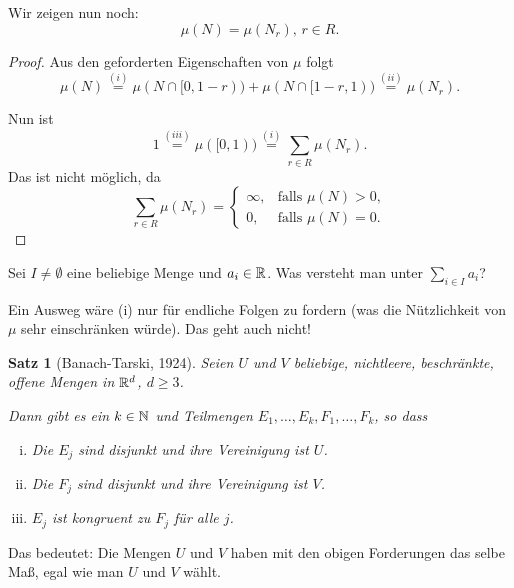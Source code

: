 \documentclass[
 a4paper,
 12pt,
 parskip=half
 ]{scrreprt}
\theoremstyle{plain}
\newtheorem{thm}{Satz}[section] %
\theoremstyle{definition}
\numberwithin{equation}{section}
\begin{document}
Wir zeigen nun noch:
\[ \mu( N ) = \mu(N_r),\, r \in R. \]

\begin{proof}
 Aus den geforderten Eigenschaften von $\mu$ folgt
 \[ \mu(N) \overset{(i)}{=} \mu( N \cap [0,1-r) ) + \mu( N \cap [1-r, 1) ) \overset{(ii)}{=} \mu(N_r). \] 
 
 Nun ist
 \[ 1 \overset{(iii)}{=} \mu( [0,1) ) \overset{(i)}{=} \sum_{r \in R} \mu( N_r ). \]
 Das ist nicht möglich, da
 \[ \sum_{r \in R} \mu( N_r ) = 
   \begin{cases}
    \infty, & \text{falls } \mu(N) > 0, \\
    0, & \text{falls } \mu(N) = 0.
   \end{cases} \]
\end{proof}

Sei $I \ne \emptyset$ eine beliebige Menge und $a_i \in \mathbb{R}$. Was versteht man unter $\sum_{i \in I} a_i$?

Ein Ausweg wäre (i) nur für endliche Folgen zu fordern (was die Nützlichkeit von $\mu$ sehr einschränken würde). Das geht auch nicht!

\begin{thm}[Banach-Tarski, 1924]
 Seien $U$ und $V$ beliebige, nichtleere, beschränkte, offene Mengen in $\mathbb{R}^d$, $d \ge 3$.
 
 Dann gibt es ein $k \in \mathbb{N}$ und Teilmengen $E_1, \ldots, E_k, F_1, \ldots, F_k$, so dass
 \begin{enumerate}[(i)]
  \item Die $E_j$ sind disjunkt und ihre Vereinigung ist $U$.
  \item Die $F_j$ sind disjunkt und ihre Vereinigung ist $V$.
  \item $E_j$ ist kongruent zu $F_j$ für alle $j$.
 \end{enumerate}
\end{thm}

Das bedeutet: Die Mengen $U$ und $V$ haben mit den obigen Forderungen das selbe Maß, egal wie man $U$ und $V$ wählt.
\end{document}
